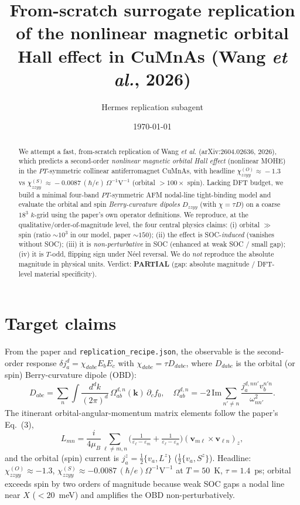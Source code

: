 \documentclass[aps,prl,twocolumn,superscriptaddress,floatfix]{revtex4-2}
\begin{document}
\title{From-scratch surrogate replication of the nonlinear magnetic orbital
Hall effect in CuMnAs (Wang \emph{et al.}, 2026)}
\author{Hermes replication subagent}
\date{\today}

\begin{abstract}
We attempt a fast, from-scratch replication of Wang \emph{et al.}
(arXiv:2604.02636, 2026), which predicts a second-order \emph{nonlinear
magnetic orbital Hall effect} (nonlinear MOHE) in the $PT$-symmetric collinear
antiferromagnet CuMnAs, with headline
$\chi^{(O)}_{zzyy}\!\approx\!-1.3$ vs $\chi^{(S)}_{zzyy}\!\approx\!-0.0087\,
(\hbar/e)\,\Omega^{-1}\mathrm{V}^{-1}$ (orbital $>\!100\times$ spin). Lacking DFT
budget, we build a minimal four-band $PT$-symmetric AFM nodal-line tight-binding
model and evaluate the orbital and spin \emph{Berry-curvature dipoles}
$D_{zzyy}$ (with $\chi=\tau D$) on a coarse $18^3$ $k$-grid using the paper's own
operator definitions. We reproduce, at the qualitative/order-of-magnitude level,
the four central physics claims: (i) orbital $\gg$ spin (ratio $\sim\!10^3$ in our
model, paper $\sim\!150$); (ii) the effect is SOC-\emph{induced} (vanishes without
SOC); (iii) it is \emph{non-perturbative} in SOC (enhanced at weak SOC / small
gap); (iv) it is $T$-odd, flipping sign under N\'eel reversal. We do \emph{not}
reproduce the absolute magnitude in physical units. Verdict: \textbf{PARTIAL}
(gap: absolute magnitude / DFT-level material specificity).
\end{abstract}

\maketitle

\section{Target claims}
From the paper and \texttt{replication\_recipe.json}, the observable is the
second-order response $\delta j^d_a = \chi_{dabc}E_bE_c$ with $\chi_{dabc}=\tau
D_{dabc}$, where $D_{dabc}$ is the orbital (or spin) Berry-curvature dipole (OBD):
\begin{equation}
D_{abc}=\sum_n\!\int\!\frac{d^dk}{(2\pi)^d}\,\Omega^{d,n}_{ab}(\bm k)\,
\partial_c f_0,\quad
\Omega^{d,n}_{ab}=-2\,\mathrm{Im}\!\sum_{n'\neq n}\frac{j^{d,nn'}_a v^{n'n}_b}{\omega_{nn'}^2}.
\end{equation}
The itinerant orbital-angular-momentum matrix elements follow the paper's Eq.~(3),
\begin{equation}
L_{mn}=\frac{i}{4\mu_B}\!\!\sum_{\ell\neq m,n}\!\!\Big(\tfrac{1}{\varepsilon_\ell-\varepsilon_m}+\tfrac{1}{\varepsilon_\ell-\varepsilon_n}\Big)(\bm v_{m\ell}\times\bm v_{\ell n})_z,
\end{equation}
and the orbital (spin) current is $j^z_a=\tfrac12\{v_a,L^z\}$
($\tfrac12\{v_a,S^z\}$). Headline: $\chi^{(O)}_{zzyy}\approx-1.3$,
$\chi^{(S)}_{zzyy}\approx-0.0087\,(\hbar/e)\Omega^{-1}\mathrm V^{-1}$ at $T=50$~K,
$\tau=1.4$~ps; orbital exceeds spin by two orders of magnitude because weak SOC
gaps a nodal line near $X$ ($<20$~meV) and amplifies the OBD non-perturbatively.
\end{document}
